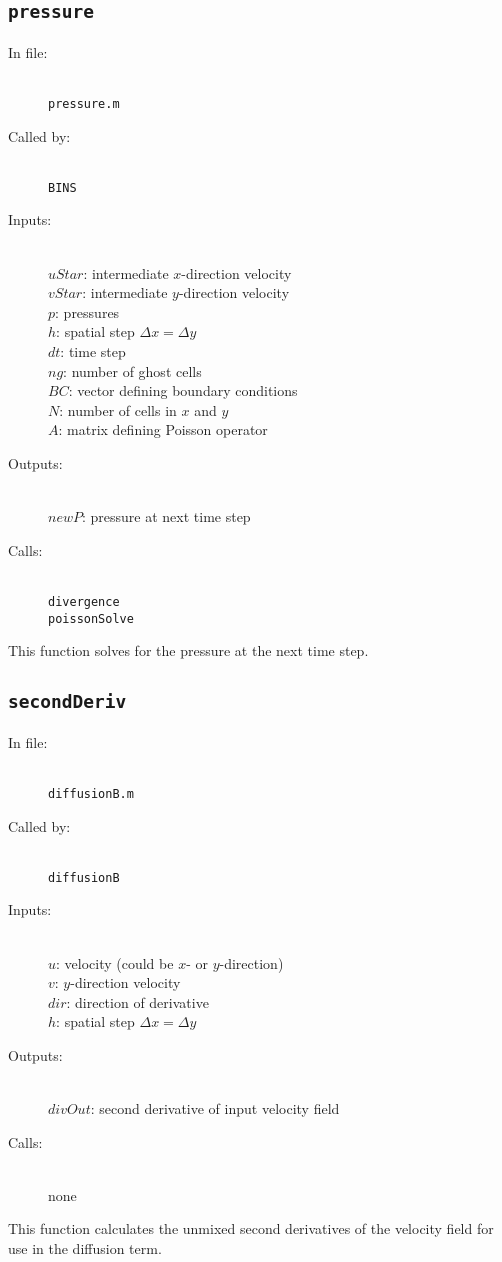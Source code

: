 \documentclass[12pt]{article}
\begin{document}
\subsection{\texttt{pressure}}
\begin{description}
\item[In file:] \hfill \\ \texttt{pressure.m}
\item[Called by:] \hfill \\ \texttt{BINS}
\item[Inputs:] \hfill \\ $uStar$: intermediate $x$-direction velocity \\ $vStar$: intermediate $y$-direction velocity \\ $p$: pressures \\ $h$: spatial step $\Delta x = \Delta y$ \\ $dt$: time step \\ $ng$: number of ghost cells \\ $BC$: vector defining boundary conditions \\ $N$: number of cells in $x$ and $y$ \\ $A$: matrix defining Poisson operator
\item[Outputs:] \hfill \\ $newP$: pressure at next time step
\item[Calls:] \hfill \\ \texttt{divergence} \\ \texttt{poissonSolve}
\end{description}
This function solves for the pressure at the next time step.

\subsection{\texttt{secondDeriv}}
\begin{description}
\item[In file:] \hfill \\ \texttt{diffusionB.m}
\item[Called by:] \hfill \\ \texttt{diffusionB}
\item[Inputs:] \hfill \\ $u$: velocity (could be $x$- or $y$-direction) \\ $v$: $y$-direction velocity \\ $dir$: direction of derivative  \\ $h$: spatial step $\Delta x = \Delta y$ 
\item[Outputs:] \hfill \\ $divOut$: second derivative of input velocity field
\item[Calls:] \hfill \\ none
\end{description}
This function calculates the unmixed second derivatives of the velocity field for use in the diffusion term.
\end{document}
